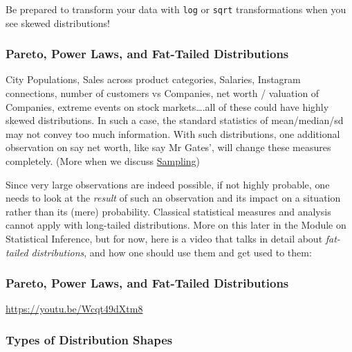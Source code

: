 \documentclass[
  letterpaper,
  DIV=11,
  numbers=noendperiod,
  oneside]{scrartcl}
\begin{document}
Be prepared to transform your data with \texttt{log} or \texttt{sqrt}
transformations when you see skewed distributions!

\subsubsection{\texorpdfstring{ Pareto, Power Laws, and Fat-Tailed
Distributions}{  Pareto, Power Laws, and Fat-Tailed Distributions}}\label{pareto-power-laws-and-fat-tailed-distributions}

City Populations, Sales across product categories, Salaries, Instagram
connections, number of customers vs Companies, net worth / valuation of
Companies, extreme events on stock markets\ldots.all of these could have
highly skewed distributions. In such a case, the standard statistics of
mean/median/sd may not convey too much information. With such
distributions, one additional observation on say net worth, like say Mr
Gates', will change these measures completely. (More when we discuss
\href{../../../20-Inference/Modules/20-SampProb/index.qmd}{Sampling})

Since very large observations are indeed possible, if not highly
probable, {one needs to look at the \emph{result} of such an observation
and its impact on a situation} rather than {its (mere) probability}.
Classical statistical measures and analysis cannot apply with
long-tailed distributions. More on this later in the Module on
Statistical Inference, but for now, here is a video that talks in detail
about \emph{fat-tailed distributions}, and how one should use them and
get used to them:

\subsubsection{\texorpdfstring{ Pareto, Power Laws, and Fat-Tailed
Distributions}{  Pareto, Power Laws, and Fat-Tailed Distributions}}\label{pareto-power-laws-and-fat-tailed-distributions-1}

\url{https://youtu.be/Wcqt49dXtm8}

\subsubsection{\texorpdfstring{ Types of Distribution
Shapes}{ Types of Distribution Shapes}}\label{types-of-distribution-shapes}
\end{document}
